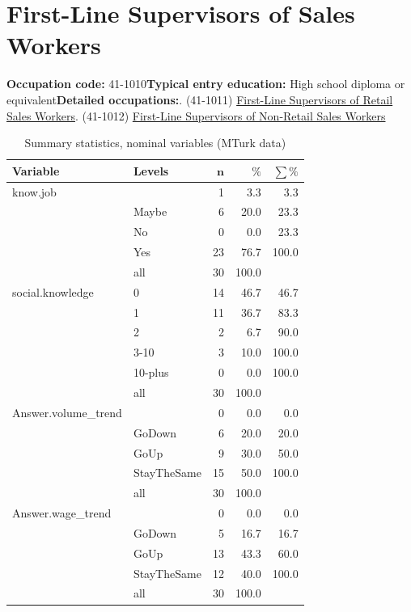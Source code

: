 \documentclass[a4paper,10pt]{article}\usepackage[]{graphicx}\usepackage[]{color}
\begin{document}
\newpage\section{First-Line Supervisors of Sales Workers}\textbf{Occupation code:} 41-1010\newline\textbf{Typical entry education:} High school diploma or equivalent\newline\textbf{Detailed occupations:}. (41-1011)  \href{http://www.bls.gov/oes/current/oes411011.htm}{First-Line Supervisors of Retail Sales Workers}. (41-1012)  \href{http://www.bls.gov/oes/current/oes411012.htm}{First-Line Supervisors of Non-Retail Sales Workers}\newline%
\begin{table}[ht]
\centering
{\footnotesize
\begin{tabular}{ll|rrr}
 \textbf{Variable} & \textbf{Levels} & $\mathbf{n}$ & $\mathbf{\%}$ & $\mathbf{\sum \%}$ \\ 
  \hline
know.job &  & 1 & 3.3 & 3.3 \\ 
   & Maybe & 6 & 20.0 & 23.3 \\ 
   & No & 0 & 0.0 & 23.3 \\ 
   & Yes & 23 & 76.7 & 100.0 \\ 
   \hline
 & all & 30 & 100.0 &  \\ 
   \hline
\hline
social.knowledge & 0 & 14 & 46.7 & 46.7 \\ 
   & 1 & 11 & 36.7 & 83.3 \\ 
   & 2 & 2 & 6.7 & 90.0 \\ 
   & 3-10 & 3 & 10.0 & 100.0 \\ 
   & 10-plus & 0 & 0.0 & 100.0 \\ 
   \hline
 & all & 30 & 100.0 &  \\ 
   \hline
\hline
Answer.volume\_trend &  & 0 & 0.0 & 0.0 \\ 
   & GoDown & 6 & 20.0 & 20.0 \\ 
   & GoUp & 9 & 30.0 & 50.0 \\ 
   & StayTheSame & 15 & 50.0 & 100.0 \\ 
   \hline
 & all & 30 & 100.0 &  \\ 
   \hline
\hline
Answer.wage\_trend &  & 0 & 0.0 & 0.0 \\ 
   & GoDown & 5 & 16.7 & 16.7 \\ 
   & GoUp & 13 & 43.3 & 60.0 \\ 
   & StayTheSame & 12 & 40.0 & 100.0 \\ 
   \hline
 & all & 30 & 100.0 &  \\ 
   \hline
\hline
\end{tabular}
}
\caption{Summary statistics, nominal variables (MTurk data)} 
\label{tab1:41-1010}
\end{table}
\end{document}
